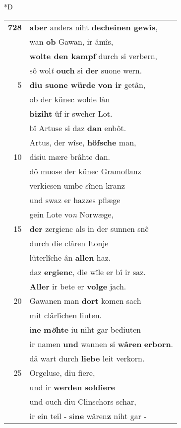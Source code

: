 \documentclass[8pt,a4paper,notitlepage]{article}
\begin{document}
\begin{table}[ht]
\begin{minipage}[t]{0.5\linewidth}
\small
\begin{center}*D
\end{center}
\begin{tabular}{rl}
\textbf{728} & \textbf{aber} anders niht \textbf{decheinen gewîs},\\ 
 & wan \textbf{ob} Gawan, ir âmîs,\\ 
 & \textbf{wolte den kampf} durch si verbern,\\ 
 & sô wol\textit{t} \textbf{ouch} si \textbf{der} suone wern.\\ 
5 & \textbf{diu suone würde} \textbf{von ir} getân,\\ 
 & ob der künec wolde lân\\ 
 & \textbf{biziht} ûf ir sweher Lot.\\ 
 & bî Artuse si daz \textbf{dan} enbôt.\\ 
 & Artus, der wîse, \textbf{höfsche} man,\\ 
10 & disiu mære brâhte dan.\\ 
 & dô muose der künec Gramoflanz\\ 
 & verkiesen umbe sînen kranz\\ 
 & und swaz er hazzes pflæge\\ 
 & gein Lote vo\textit{n} Norwæge,\\ 
15 & \textbf{der} zergienc als in der sunnen snê\\ 
 & durch die clâren Itonje\\ 
 & lûterlîche ân \textbf{allen} haz.\\ 
 & daz \textbf{ergienc}, die wîle er bî ir saz.\\ 
 & \textbf{Aller} ir bete er \textbf{volge} jach.\\ 
20 & Gawanen man \textbf{dort} komen sach\\ 
 & mit clârlîchen liuten.\\ 
 & i\textbf{ne} \textbf{m\textit{ö}hte} iu niht gar bediuten\\ 
 & ir namen \textbf{und} wannen si \textbf{wâren} \textbf{erborn}.\\ 
 & dâ wart durch \textbf{liebe} leit verkorn.\\ 
25 & Orgeluse, diu fiere,\\ 
 & und ir \textbf{werden} \textbf{soldiere}\\ 
 & und ouch diu Clinschors schar,\\ 
 & ir ein teil - si\textbf{ne} wâren\textbf{z} niht gar -\\ 

\end{tabular}
\end{minipage}
\end{table}
\end{document}
